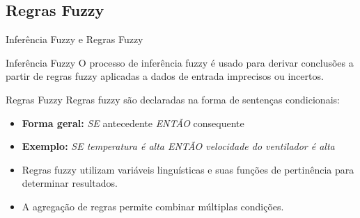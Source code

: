 \documentclass{beamer}
\begin{document}
\subsection{Regras Fuzzy}
\footnotesize
\begin{frame}{Inferência Fuzzy e Regras Fuzzy}
    \begin{block}{Inferência Fuzzy}
        O processo de inferência fuzzy é usado para derivar conclusões a partir de regras fuzzy aplicadas a dados de entrada imprecisos ou incertos.
    \end{block}
    \pause
    \begin{block}{Regras Fuzzy}
        Regras fuzzy são declaradas na forma de sentenças condicionais:
        \begin{itemize}
            \item \textbf{Forma geral:} \textit{SE} antecedente \textit{ENTÃO} consequente
            \item \textbf{Exemplo:} \textit{SE temperatura é alta ENTÃO velocidade do ventilador é alta}
        \end{itemize}
    \end{block}
    \pause
    \begin{itemize}
        \item Regras fuzzy utilizam variáveis linguísticas e suas funções de pertinência para determinar resultados.
        \item A agregação de regras permite combinar múltiplas condições.
    \end{itemize}
    \pause
    \centering
\end{frame}
\end{document}
